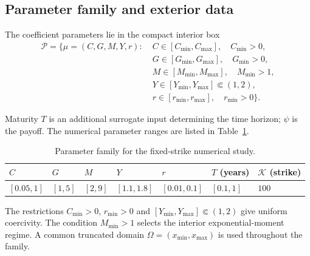 \documentclass[11pt]{amsart}
\theoremstyle{remark}
\newcommand{\Pset}{\mathcal{P}}
\newcommand{\rf}{r}
\begin{document}
\subsection{Parameter family and exterior data}
\label{ssec:family}\label{ssec:finite-domain}
The coefficient parameters lie in the compact interior box
\begin{equation}
\begin{aligned}
 \Pset=\bigl\{\mu=(C,G,M,Y,\rf):\;&
 C\in[C_{\min},C_{\max}],\quad C_{\min}>0,\\
 &G\in[G_{\min},G_{\max}],\quad G_{\min}>0,\\
 &M\in[M_{\min},M_{\max}],\quad M_{\min}>1,\\
 &Y\in[Y_{\min},Y_{\max}]\Subset(1,2),\\
 &\rf\in[r_{\min},r_{\max}],\quad r_{\min}>0\bigr\}.
\end{aligned}
 \label{eq:parameter-set}
\end{equation}

Maturity $T$ is an additional surrogate input determining the time horizon;
$\psi$ is the payoff. The numerical parameter ranges are listed in
Table~\ref{tab:proposed-box}.
\begin{table}[ht]
\centering\small
\caption{Parameter family for the fixed-strike numerical study.}
\label{tab:proposed-box}
\begin{tabular}{lllllll}
\toprule
$C$ & $G$ & $M$ & $Y$ & $r$ & $T$ (years) & $\mathcal K$ (strike)\\
\midrule
$[0.05,1]$ & $[1,5]$ & $[2,9]$ & $[1.1,1.8]$ & $[0.01,0.1]$ & $[0.1,1]$ & $100$\\
\bottomrule
\end{tabular}
\end{table}
The restrictions $C_{\min}>0$, $r_{\min}>0$ and
$[Y_{\min},Y_{\max}]\Subset(1,2)$ give uniform coercivity.
The condition $M_{\min}>1$ selects the interior exponential-moment regime.
A common truncated domain $\Omega=(x_{\min},x_{\max})$ is used throughout
the family.
\end{document}
